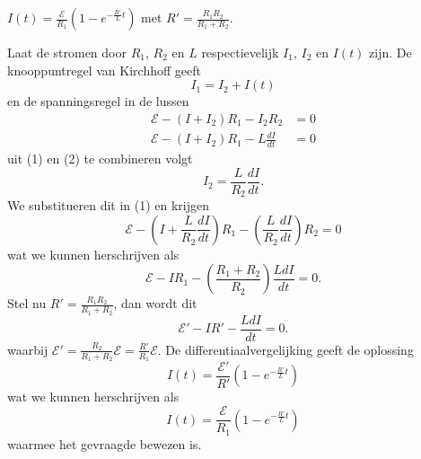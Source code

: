 \begin{description}[labelwidth=1.5cm, leftmargin=!]
    \item[TB. :] $I(t) = \frac{\mathcal{E}}{R_1} \left( 1 - e^{-\tfrac{R'}{L}t} \right)$ met $R' = \frac{R_1R_2}{R_1 + R_2}$.
    \item[B. :]
        Laat de stromen door $R_1$, $R_2$ en $L$ respectievelijk $I_1$, $I_2$ en $I(t)$ zijn. De knooppuntregel van Kirchhoff geeft
        \begin{equation*}
            I_1 = I_2 + I(t)
        \end{equation*}
        en de spanningsregel in de lussen
        \begin{align}
            \mathcal{E} - (I + I_2)R_1 - I_2R_2 &= 0 \\
            \mathcal{E} - (I + I_2)R_1 -L\frac{dI}{dt} &= 0
        \end{align}
        uit (1) en (2) te combineren volgt
        \begin{equation*}
            I_2 = \frac{L}{R_2} \frac{dI}{dt}.
        \end{equation*}
        We substitueren dit in (1) en krijgen
        \begin{equation*}
            \mathcal{E} - \left(I + \frac{L}{R_2} \frac{dI}{dt} \right)R_1 - \left(\frac{L}{R_2} \frac{dI}{dt}\right)R_2 = 0 
        \end{equation*}
        wat we kunnen herschrijven als
        \begin{equation*}
            \mathcal{E} - IR_1 - \left(\frac{R_1 + R_2 }{R_2} \right)\frac{LdI}{dt} = 0.
        \end{equation*}
        Stel nu $R' = \frac{R_1R_2}{R_1 + R_2}$, dan wordt dit
        \begin{equation*}
            \mathcal{E}' - IR' - \frac{LdI}{dt} = 0.
        \end{equation*}
        waarbij $\mathcal{E}' = \frac{R_2}{R_1+R_2}\mathcal{E} = \frac{R'}{R_1}\mathcal{E}$. De differentiaalvergelijking geeft de oplossing
        \begin{equation*}
            I(t) = \frac{\mathcal{E}'}{R'} \left( 1 - e^{-\tfrac{R'}{L}t} \right)
        \end{equation*}
        wat we kunnen herschrijven als
        \begin{equation*}
            I(t) = \frac{\mathcal{E}}{R_1} \left( 1 - e^{-\tfrac{R'}{L}t} \right)
        \end{equation*}
        waarmee het gevraagde bewezen is.
\end{description}


\vspace{1cm}